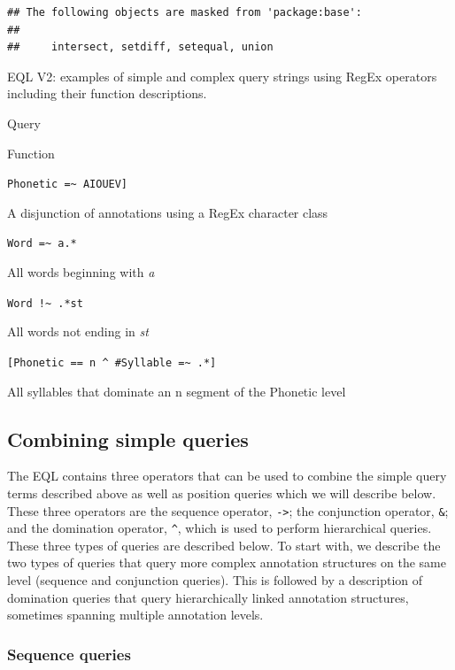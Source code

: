 \documentclass[]{book}
\begin{document}
\begin{verbatim}
## The following objects are masked from 'package:base':
## 
##     intersect, setdiff, setequal, union
\end{verbatim}

\label{tab:eqlExamples}EQL V2: examples of simple and complex query strings using RegEx operators including their function descriptions.

Query

Function

\texttt{Phonetic\ =\textasciitilde{}\ \textquotesingle{}{[}AIOUEV{]}\textquotesingle{}}

A disjunction of annotations using a RegEx character class

\texttt{Word\ =\textasciitilde{}\ a.*}

All words beginning with \emph{a}

\texttt{Word\ !\textasciitilde{}\ .*st}

All words not ending in \emph{st}

\texttt{{[}Phonetic\ ==\ n\ \^{}\ \#Syllable\ =\textasciitilde{}\ .*{]}}

All syllables that dominate an n segment of the Phonetic level

\hypertarget{combining-simple-queries}{%
\subsection{Combining simple queries}\label{combining-simple-queries}}

The EQL contains three operators that can be used to combine the simple query terms described above as well as position queries which we will describe below. These three operators are the sequence operator, \texttt{-\textgreater{}}; the conjunction operator, \texttt{\&}; and the domination operator, \texttt{\^{}}, which is used to perform hierarchical queries. These three types of queries are described below. To start with, we describe the two types of queries that query more complex annotation structures on the same level (sequence and conjunction queries). This is followed by a description of domination queries that query hierarchically linked annotation structures, sometimes spanning multiple annotation levels.

\hypertarget{sequence-queries}{%
\subsubsection{Sequence queries}\label{sequence-queries}}
\end{document}
